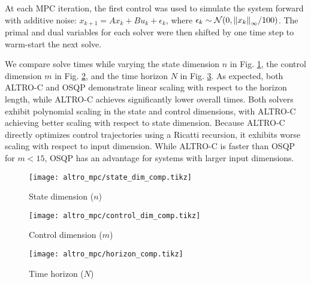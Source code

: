 \documentclass[../root.tex]{subfiles}
\begin{document}
At each MPC iteration, the first control was used to simulate the system
forward with additive noise: $x_{k+1} = A x_k + B u_k + \epsilon_k$, where
$\epsilon_k \sim \mathcal{N}(0,\norm{x_k}_\infty / 100)$. The primal and dual
variables for each solver were then shifted by one time step to warm-start
the next solve.

We compare solve times while varying the state dimension $n$ in Fig.
\ref{fig:state_dim_comp}, the control dimension $m$ in Fig.
\ref{fig:control_dim_comp}, and the time horizon $N$ in Fig.
\ref{fig:horizon_comp}. As expected, both ALTRO-C and OSQP demonstrate linear
scaling with respect to the horizon length, while ALTRO-C achieves
significantly lower overall times. Both solvers exhibit polynomial scaling in
the state and control dimensions, with ALTRO-C achieving better scaling with
respect to state dimension. Because ALTRO-C directly optimizes control
trajectories using a Ricatti recursion, it exhibits worse scaling with
respect to input dimension. While ALTRO-C is faster than OSQP for $m < 15$,
OSQP has an advantage for systems with larger input dimensions.


\begin{figure*}
    \centering
    \begin{subfigure}{0.32\textwidth}
        \texttt{[image: altro\_mpc/state\_dim\_comp.tikz]}
        \caption{State dimension ($n$)}
        \label{fig:state_dim_comp}
    \end{subfigure}
    \begin{subfigure}{0.32\textwidth}
        \centering
        \texttt{[image: altro\_mpc/control\_dim\_comp.tikz]}
        \caption{Control dimension ($m$)}
        \label{fig:control_dim_comp}
    \end{subfigure}
    \begin{subfigure}{0.32\textwidth}
        \centering
        \texttt{[image: altro\_mpc/horizon\_comp.tikz]}
        \caption{Time horizon ($N$)}
        \label{fig:horizon_comp}
    \end{subfigure}
    \caption{Comparison of ALTRO-C and OSQP as a function of a) state dimension ($N=21,m=2$), b) control dimension ($N=21,n=30$), and c) horizon length ($n=12,m=6$). The x-axis is labeled at the sampled sizes.}
\end{figure*}
\end{document}
